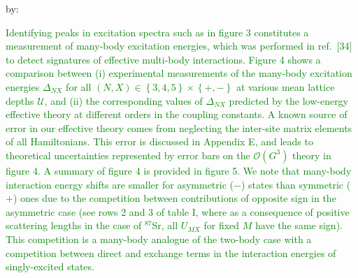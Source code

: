 \documentclass[preprint,showkeys,nofootinbib]{revtex4-1}
\newcommand{\p}[1]{\left(#1\right)} %
\renewcommand{\set}[1]{\left\{#1\right\}} %
\renewcommand{\O}{\mathcal{O}}
\newcommand{\U}{\mathcal{U}}
\newcommand{\1}{\mathds{1}}
\newcommand{\green}[1]{\textcolor{green}{#1}}
\newcounter{point}
\begin{document}
\begin{enumerate}[label=(R2.\arabic{point}.\arabic*)]
  by:

  \green{Identifying peaks in excitation spectra such as in figure 3
    constitutes a measurement of many-body excitation energies, which
    was performed in ref.~[34] to detect signatures of effective
    multi-body interactions.  Figure 4 shows a comparison between (i)
    experimental measurements of the many-body excitation energies
    $\Delta_{NX}$ for all $\p{N,X}\in\set{3,4,5}\times\set{+,-}$ at
    various mean lattice depths $\U$, and (ii) the corresponding
    values of $\Delta_{NX}$ predicted by the low-energy effective
    theory at different orders in the coupling constants.  A known
    source of error in our effective theory comes from neglecting the
    inter-site matrix elements of all Hamiltonians.  This error is
    discussed in Appendix E, and leads to theoretical uncertainties
    represented by error bars on the $\O\p{G^3}$ theory in figure 4.
    A summary of figure 4 is provided in figure 5.  We note that
    many-body interaction energy shifts are smaller for asymmetric
    ($-$) states than symmetric ($+$) ones due to the competition
    between contributions of opposite sign in the asymmetric case (see
    rows 2 and 3 of table I, where as a consequence of positive
    scattering lengths in the case of $^{87}$Sr, all $U_{MX}$ for
    fixed $M$ have the same sign).  This competition is a many-body
    analogue of the two-body case with a competition between direct
    and exchange terms in the interaction energies of singly-excited
    states.}


\end{enumerate}
\end{document}
